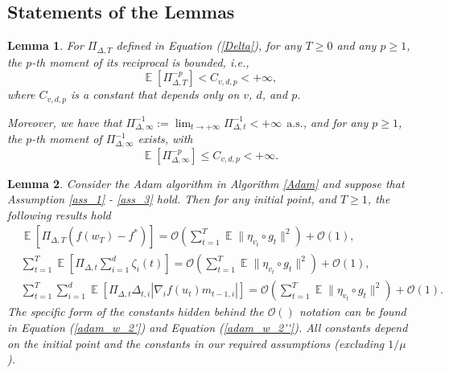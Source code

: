 \documentclass{article} %
\newtheorem{lemma}{Lemma}[section]
\DeclareMathOperator{\Expect}{\mathbb{E}}
\begin{document}
\subsection{Statements of the Lemmas}


\begin{lemma}\label{bounded_moment}
For $\Pi_{\Delta,T}$ defined in Equation (\ref{Delta}), for any $T \geq 0$ and any $p \geq 1$, the $p$-th moment of its reciprocal is bounded, i.e.,
\[\Expect\left[\Pi^{-p}_{\Delta,T}\right] < C_{v,d,p} < +\infty,\]
where $C_{v,d,p}$ is a constant that depends only on $v$, $d$, and $p$.

Moreover, we have that $\Pi^{-1}_{\Delta,\infty} := \lim_{t \rightarrow +\infty} \Pi^{-1}_{\Delta,t} < +\infty \ \ \text{a.s.}$, and for any $p \geq 1$, the $p$-th moment of $\Pi^{-1}_{\Delta,\infty}$ exists, with
\[\Expect\left[\Pi^{-p}_{\Delta,\infty}\right] \leq C_{v,d,p} < +\infty.\]
\end{lemma}
\begin{lemma}\label{lem_sum'}
Consider the Adam algorithm in Algorithm \ref{Adam} and suppose that Assumption \ref{ass_1} - \ref{ass_3} hold. Then for any initial point, and $T \geq 1$, the following results hold
\begin{align*}
&\Expect[\Pi_{\Delta,T}(f(w_{T})-f^*)]=\mathcal{O}\left(\sum_{t=1}^{T}\Expect\|\eta_{v_{t}}\circ g_{t}\|^{2}\right)+\mathcal{O}(1),  
\\&\sum_{t=1}^{T}\Expect\left[\Pi_{\Delta,t}\sum_{i=1}^{d}\zeta_{i}(t)\right]=\mathcal{O}\left(\sum_{t=1}^{T}\Expect\|\eta_{v_{t}}\circ g_{t}\|^{2}\right)+\mathcal{O}(1),
\\&\sum_{t=1}^{T}\sum_{i=1}^{d}\Expect\left[\Pi_{\Delta,t}\Delta_{t,i}|\nabla_{i} f(u_{t})m_{t-1,i}|\right]=\mathcal{O}\left(\sum_{t=1}^{T}\Expect\|\eta_{v_{t}}\circ g_{t}\|^{2}\right)+\mathcal{O}(1).
\end{align*}
The specific form of the constants hidden behind the \(\mathcal{O}()\) notation can be found in Equation (\ref{adam_w_2'}) and Equation (\ref{adam_w_2''}). All constants depend on the initial point and the constants in our required assumptions (excluding $1/\mu$).
\end{lemma}
\end{document}
